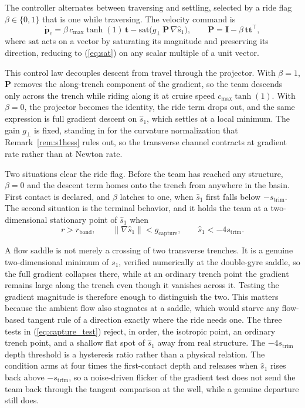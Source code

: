 \documentclass[lettersize,journal]{IEEEtran}
\begin{document}
The controller alternates between traversing and settling, selected by a
ride flag $\beta \in \{0,1\}$ that is one while traversing. The velocity
command is
\begin{equation}
    \dot{\mathbf{p}}_c =
    \beta\,c_{\max}\tanh(1)\,\mathbf{t}
    - \mathrm{sat}\!\bigl(g_\perp\,\mathbf{P}\,\nabla\hat{s}_1\bigr),
    \qquad
    \mathbf{P} = \mathbf{I} - \beta\,\mathbf{t}\mathbf{t}^\top,
    \label{eq:oecs_law}
\end{equation}
where $\mathrm{sat}$ acts on a vector by saturating its magnitude and
preserving its direction, reducing to (\ref{eq:sat}) on any scalar
multiple of a unit vector.

This control law decouples descent from travel through the projector.
With $\beta = 1$, $\mathbf{P}$ removes the along-trench component of the
gradient, so the team descends only across the trench while riding along
it at cruise speed $c_{\max}\tanh(1)$. With $\beta = 0$, the projector
becomes the identity, the ride term drops out, and the same expression
is full gradient descent on $\hat{s}_1$, which settles at a local
minimum. The gain $g_\perp$ is fixed, standing in for the curvature
normalization that Remark~\ref{rem:s1hess} rules out, so the transverse
channel contracts at gradient rate rather than at Newton rate.

Two situations clear the ride flag. Before the team has reached any
structure, $\beta = 0$ and the descent term homes onto the trench from
anywhere in the basin. First contact is declared, and $\beta$ latches to
one, when $\hat{s}_1$ first falls below $-s_{\mathrm{trim}}$. The second
situation is the terminal behavior, and it holds the team at a
two-dimensional stationary point of $\hat{s}_1$ when
\begin{equation}
    r > r_{\mathrm{band}}, \qquad
    \lVert\nabla\hat{s}_1\rVert < g_{\mathrm{capture}}, \qquad
    \hat{s}_1 < -4 s_{\mathrm{trim}}.
    \label{eq:capture_test}
\end{equation}

A flow saddle is not merely a crossing of two transverse trenches. It is
a genuine two-dimensional minimum of $s_1$, verified numerically at the
double-gyre saddle, so the full gradient collapses there, while at an
ordinary trench point the gradient remains large along the trench even
though it vanishes across it. Testing the gradient magnitude is
therefore enough to distinguish the two. This matters because the
ambient flow also stagnates at a saddle, which would starve any
flow-based tangent rule of a direction exactly where the ride needs one.
The three tests in (\ref{eq:capture_test}) reject, in order, the
isotropic point, an ordinary trench point, and a shallow flat spot of
$\hat{s}_1$ away from real structure. The $-4s_{\mathrm{trim}}$ depth
threshold is a hysteresis ratio rather than a physical relation. The
condition arms at four times the first-contact depth and releases when
$\hat{s}_1$ rises back above $-s_{\mathrm{trim}}$, so a noise-driven
flicker of the gradient test does not send the team back through the
tangent comparison at the well, while a genuine departure still does.
\end{document}
